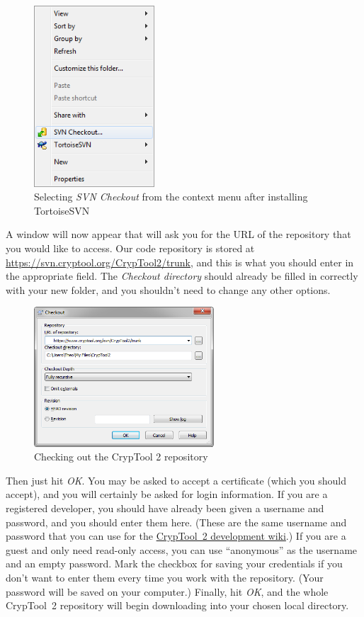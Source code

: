 \begin{figure}[h!]
	\centering
		\includegraphics[width=0.40\textwidth]{figures/tortoise_svn_checkout.png}
	\caption{Selecting \textit{SVN Checkout} from the context menu after installing TortoiseSVN}
	\label{fig:tortoise_svn_checkout}
\end{figure}
\clearpage

A window will now appear that will ask you for the URL of the repository that you would like to access. Our code repository is stored at \url{https://svn.cryptool.org/CrypTool2/trunk}, and this is what you should enter in the appropriate field. The \textit{Checkout directory} should already be filled in correctly with your new folder, and you shouldn't need to change any other options.

\begin{figure}[h!]
	\centering
		\includegraphics[width=0.60\textwidth]{figures/tortoise_svn_checkout_window.png}
	\caption{Checking out the CrypTool 2 repository}
	\label{fig:tortoise_svn_checkout2}
\end{figure}

Then just hit \textit{OK}. You may be asked to accept a certificate (which you should accept), and you will certainly be asked for login information. If you are a registered developer, you should have already been given a username and password, and you should enter them here. (These are the same username and password that you can use for the \href{https://trac.ct2.cryptool.org/}{CrypTool~2 development wiki}.) If you are a guest and only need read-only access, you can use ``anonymous'' as the username and an empty password. Mark the checkbox for saving your credentials if you don't want to enter them every time you work with the repository. (Your password will be saved on your computer.) Finally, hit \textit{OK}, and the whole CrypTool~2 repository will begin downloading into your chosen local directory.

